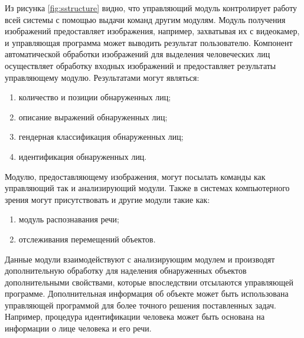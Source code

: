 Из рисунка \ref{fig:sstructure} видно, что управляющий модуль контролирует работу всей системы с помощью выдачи команд другим модулям.
Модуль получения изображений предоставляет изображения, например,  захватывая их с видеокамер, и управляющая программа может выводить результат пользователю.
Компонент автоматической обработки изображений для выделения человеческих лиц осуществляет обработку входных изображений и предоставляет результаты управляющему модулю.
Результатами могут являться:

\begin{enumerate}
  \item количество и позиции обнаруженных лиц;
  \item описание выражений обнаруженных лиц;
  \item гендерная классификация обнаруженных лиц;
  \item идентификация обнаруженных лиц.
\end{enumerate}


Модулю, предоставляющему изображения, могут посылать команды как управляющий так и анализирующий модули. Также в системах компьютерного зрения могут присутствовать и другие модули такие как:

\begin{enumerate}
  \item модуль распознавания речи;
  \item отслеживания перемещений объектов.
\end{enumerate}

Данные модули взаимодействуют с анализирующим модулем и производят дополнительную обработку для наделения обнаруженных объектов дополнительными свойствами, которые впоследствии отсылаются управляющей программе. Дополнительная информация об объекте может быть использована управляющей программой для более точного решения поставленных задач. Например, процедура идентификации человека может быть основана на информации о лице человека и его речи.





